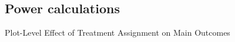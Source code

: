 \documentclass[10pt]{article}
\begin{document}
\subsection{Power calculations}
\begin{table}[H]
\caption{Plot-Level Effect of Treatment Assignment on Main Outcomes}
\begin{center}
\begin{adjustbox}{max width = \textwidth}

\end{adjustbox}
\end{center}
\end{table}
\end{document}
